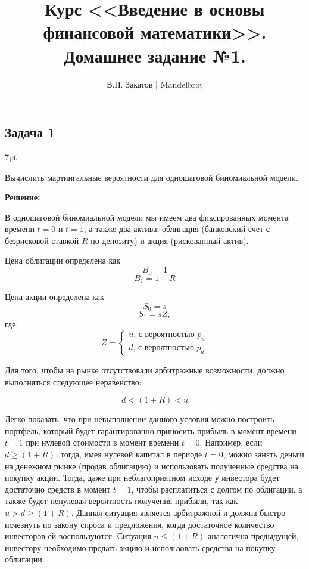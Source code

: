 \documentclass[a4paper,12pt]{article}
\title{Курс <<Введение в основы финансовой математики>>.\\Домашнее задание №1.}
\date{}
\author{В.П. Закатов | Mandelbrot}
\newenvironment{formal}{%
	\def\FrameCommand{%
		\hspace{1pt}%
		{\color{black}\vrule width 1.5pt}%
		{\color{white}\vrule width 4pt}%
		\colorbox{white}%
	}%
	\MakeFramed{\advance\hsize-\width\FrameRestore}%
	\noindent\hspace{-4.55pt}%
	\begin{adjustwidth}{}{7pt}%
		\vspace{2pt}\vspace{2pt}%
	}
	{%
		\vspace{2pt}\end{adjustwidth}\endMakeFramed%
}
\begin{document}
\maketitle

\subsection*{Задача 1}
\begin{formal}
Вычислить мартингальные вероятности для одношаговой биномиальной модели.
\end{formal}
\textbf{\large Решение:}

В одношаговой биномиальной модели мы имеем два фиксированных момента времени $t=0$ и $t=1$, а также два актива: облигация (банковский счет с безрисковой ставкой $R$ по депозиту) и акция (рискованный актив). 

Цена облигации определена как
\begin{equation*}
	B_0 = 1
\end{equation*}
\begin{equation*}
	B_1 = 1 + R
\end{equation*}

Цена акции определена как 
\begin{equation*}
	S_0 = s
\end{equation*}
\begin{equation*}
	S_1 = sZ,
\end{equation*}
где
\begin{equation*}
	Z = \begin{cases} u \text{, с вероятностью $p_u$} \\ d \text{, с вероятностью $p_d$} \end{cases}
\end{equation*}

Для того, чтобы на рынке отсутствовали арбитражные возможности, должно выполняться следующее неравенство:

\begin{equation}
	d < (1+R) < u
\end{equation}

Легко показать, что при невыполнении данного условия можно построить портфель, который будет гарантированно приносить прибыль в момент времени $t = 1$ при нулевой стоимости в момент времени $t = 0$. Например, если $d \geq (1+R)$, тогда, имея нулевой капитал в периоде $t=0$, можно занять деньги на денежном рынке (продав облигацию) и использовать полученные средства на покупку акции. Тогда, даже при неблагоприятном исходе у инвестора будет достаточно средств в момент $t=1$, чтобы расплатиться с долгом по облигации, а также будет ненулевая вероятность получения прибыли, так как $u > d \geq (1+R)$. Данная ситуация является арбитражной и должна быстро исчезнуть по закону спроса и предложения, когда достаточное количество инвесторов ей воспользуются. Ситуация $u \leq (1+R)$ аналогична предыдущей, инвестору необходимо продать акцию и использовать средства на покупку облигации.
\end{document}
